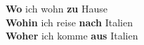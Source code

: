\documentclass[a4paper]{article}
\title{}
\date{}
\begin{document}
    \maketitle
    \textbf{Wo} ich  wohn \textbf{zu} Hause\\
    \textbf{Wohin} ich  reise \textbf{nach} Italien\\
    \textbf{Woher} ich  komme \textbf{aus} Italien\\
    
\end{document}
